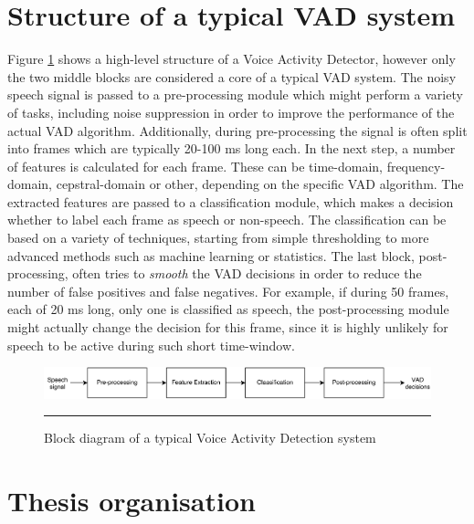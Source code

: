 \section{Structure of a typical VAD system}

Figure \ref{fig:VADStructure} shows a high-level structure of a Voice Activity Detector, however only the two middle blocks are considered a core of a typical VAD system. The noisy speech signal is passed to a pre-processing module which might perform a variety of tasks, including noise suppression in order to improve the performance of the actual VAD algorithm. Additionally, during pre-processing the signal is often split into frames which are typically 20-100 ms long each. In the next step, a number of features is calculated for each frame. These can be time-domain, frequency-domain, cepstral-domain or other, depending on the specific VAD algorithm. The extracted features are passed to a classification module, which makes a decision whether to label each frame as speech or non-speech. The classification can be based on a variety of techniques, starting from simple thresholding to more advanced methods such as machine learning or statistics. The last block, post-processing, often tries to \emph{smooth} the VAD decisions in order to reduce the number of false positives and false negatives. For example, if during 50 frames, each of 20 ms long, only one is classified as speech, the post-processing module might actually change the decision for this frame, since it is highly unlikely for speech to be active during such short time-window.

\begin{figure}[htbp]
	\centering
		\includegraphics[width=1\columnwidth]{Figures/VADStructure.png}
		\rule{37em}{0.5pt}
	\caption[Block diagram of a typical Voice Activity Detection system]{Block diagram of a typical Voice Activity Detection system}
	\label{fig:VADStructure}
\end{figure}


\section{Thesis organisation}

